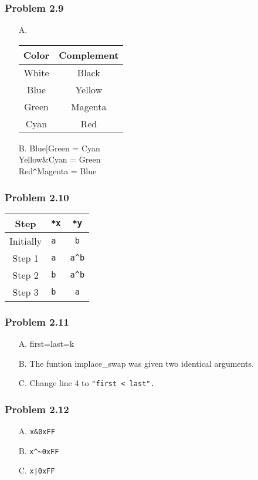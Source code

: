 \documentclass[a4paper]{article}
\begin{document}
\subsubsection*{Problem 2.9}
\begin{enumerate}
    \item [A.] 
        \begin{tabular}{cc}
            Color&Complement\\
            \hline
            White   &Black\\
            Blue    &Yellow\\
            Green   &Magenta\\
            Cyan    &Red\\
        \end{tabular}
    \item [B.]  Blue|Green = Cyan\\
                Yellow\&Cyan = Green\\
                Red\texttt{\^}Magenta = Blue
\end{enumerate}

\subsubsection*{Problem 2.10}
\begin{tabular}{ccc}
    Step&\tt{*x}&\tt{*y}\\
    \hline
    Initially   &\tt{a}  &\tt{b}\\
    Step 1      &\tt{a}  &\tt{a\^{}b}\\
    Step 2      &\tt{b}  &\tt{a\^{}b}\\
    Step 3      &\tt{b}  &\tt{a}
\end{tabular}

\subsubsection*{Problem 2.11}
\begin{enumerate}
    \item [A.] first=last=k
    \item [B.] The funtion implace\_swap was given two identical arguments.
    \item [C.] Change line 4 to \tt{"first < last"}.
\end{enumerate}

\subsubsection*{Problem 2.12}
\begin{enumerate}
    \item [A.] \tt{x\&0xFF}
    \item [B.] \tt{x\^{}\textasciitilde0xFF}
    \item [C.] \tt{x|0xFF}
\end{enumerate}
\end{document}
